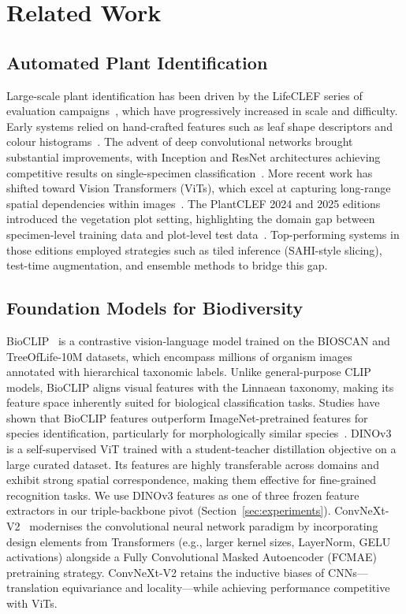 \documentclass[sigconf]{ceurart}
\begin{document}
\section{Related Work}
\label{sec:related}
\subsection{Automated Plant Identification}
Large-scale plant identification has been driven by the LifeCLEF series of evaluation campaigns~\cite{joly2024overview}, which have progressively increased in scale and difficulty. Early systems relied on hand-crafted features such as leaf shape descriptors and colour histograms~\cite{goeau2013pl}. The advent of deep convolutional networks brought substantial improvements, with Inception and ResNet architectures achieving competitive results on single-specimen classification~\cite{lee2017deep}. More recent work has shifted toward Vision Transformers (ViTs), which excel at capturing long-range spatial dependencies within images~\cite{dosovitskiy2021image}.
The PlantCLEF 2024 and 2025 editions introduced the vegetation plot setting, highlighting the domain gap between specimen-level training data and plot-level test data~\cite{goeau2024plantclef}. Top-performing systems in those editions employed strategies such as tiled inference (SAHI-style slicing), test-time augmentation, and ensemble methods to bridge this gap.
\subsection{Foundation Models for Biodiversity}
BioCLIP~\cite{stevens2024bioclip} is a contrastive vision-language model trained on the BIOSCAN and TreeOfLife-10M datasets, which encompass millions of organism images annotated with hierarchical taxonomic labels. Unlike general-purpose CLIP models, BioCLIP aligns visual features with the Linnaean taxonomy, making its feature space inherently suited for biological classification tasks. Studies have shown that BioCLIP features outperform ImageNet-pretrained features for species identification, particularly for morphologically similar species~\cite{stevens2024bioclip}.
DINOv3~\cite{oquab2024dinov2} is a self-supervised ViT trained with a student-teacher distillation objective on a large curated dataset. Its features are highly transferable across domains and exhibit strong spatial correspondence, making them effective for fine-grained recognition tasks. We use DINOv3 features as one of three frozen feature extractors in our triple-backbone pivot (Section~\ref{sec:experiments}).
ConvNeXt-V2~\cite{woo2023convnextv2} modernises the convolutional neural network paradigm by incorporating design elements from Transformers (e.g., larger kernel sizes, LayerNorm, GELU activations) alongside a Fully Convolutional Masked Autoencoder (FCMAE) pretraining strategy. ConvNeXt-V2 retains the inductive biases of CNNs---translation equivariance and locality---while achieving performance competitive with ViTs.
\end{document}
